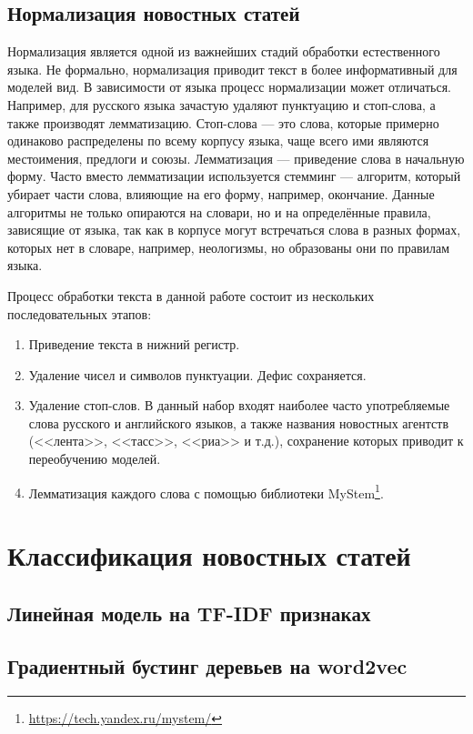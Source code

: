 \documentclass[a4paper, 14pt]{extarticle}
\begin{document}
\subsection{Нормализация новостных статей}
Нормализация является одной из важнейших стадий обработки естественного языка. Не формально, нормализация приводит текст в 
более информативный для моделей вид. В зависимости от языка процесс нормализации может отличаться. Например, для русского языка
зачастую удаляют пунктуацию и стоп-слова, а также производят лемматизацию. Стоп-слова --- это слова, которые примерно 
одинаково распределены по всему корпусу языка, чаще всего ими являются местоимения, предлоги и союзы. Лемматизация --- 
приведение слова в начальную форму. Часто вместо лемматизации используется стемминг --- алгоритм, который убирает части 
слова, влияющие на его форму, например, окончание. Данные алгоритмы не только опираются на словари, но и на 
определённые правила, зависящие от языка, так как в корпусе могут встречаться слова в разных формах, которых нет в 
словаре, например, неологизмы, но образованы они по правилам языка.

Процесс обработки текста в данной работе состоит из нескольких последовательных этапов:
\begin{enumerate}
	\item Приведение текста в нижний регистр.
	\item Удаление чисел и символов пунктуации. Дефис сохраняется.
	\item Удаление стоп-слов. В данный набор входят наиболее часто употребляемые слова русского и английского языков,
	а также названия новостных агентств (<<лента>>, <<тасс>>, <<риа>> и т.д.), сохранение которых приводит к 
	переобучению моделей.
	\item Лемматизация каждого слова с помощью библиотеки MyStem\footnote{\url{https://tech.yandex.ru/mystem/}}.
\end{enumerate}

\section{Классификация новостных статей}
\subsection{Линейная модель на TF-IDF признаках}
\subsection{Градиентный бустинг деревьев на word2vec}
\end{document}

